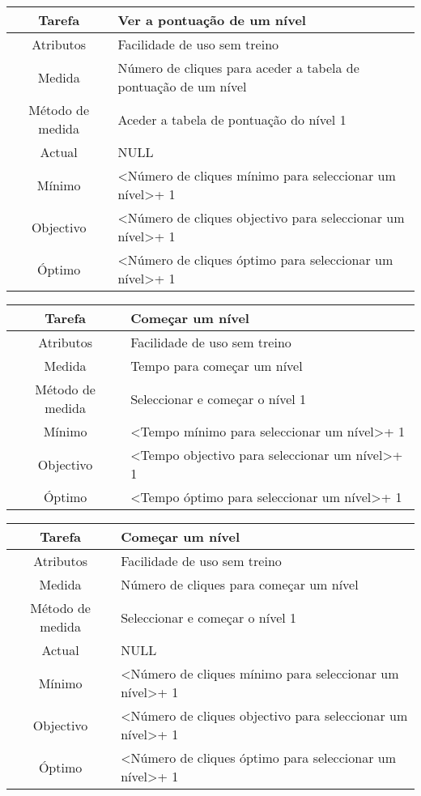\begin{center}
	\begin{tabular} {|c|p{10cm}|}
		\hline
		Tarefa & Ver a pontuação de um nível \\
		\hline
		Atributos & Facilidade de uso sem treino \\
		\hline
		Medida & Número de cliques para aceder a tabela de pontuação de um nível \\
		\hline
		Método de medida & Aceder a tabela de pontuação do nível 1 \\
		\hline
		Actual & NULL \\
		Mínimo & \textless Número de cliques mínimo para seleccionar um nível\textgreater + 1 \\
		Objectivo & \textless Número de cliques objectivo para seleccionar um nível\textgreater + 1 \\
		Óptimo & \textless Número de cliques óptimo para seleccionar um nível\textgreater + 1 \\
		\hline
	\end{tabular}
\end{center}

\begin{center}
	\begin{tabular} {|c|p{10cm}|}
		\hline
		Tarefa & Começar um nível \\
		\hline
		Atributos & Facilidade de uso sem treino \\
		\hline
		Medida & Tempo para começar um nível \\
		\hline
		Método de medida & Seleccionar e começar o nível 1 \\
		\hline
		Mínimo & \textless Tempo mínimo para seleccionar um nível\textgreater + 1 \\
		Objectivo & \textless Tempo objectivo para seleccionar um nível\textgreater + 1 \\
		Óptimo & \textless Tempo óptimo para seleccionar um nível\textgreater + 1 \\
		\hline
	\end{tabular}
\end{center}

\begin{center}
	\begin{tabular} {|c|p{10cm}|}
		\hline
		Tarefa & Começar um nível \\
		\hline
		Atributos & Facilidade de uso sem treino \\
		\hline
		Medida & Número de cliques para começar um nível \\
		\hline
		Método de medida & Seleccionar e começar o nível 1 \\
		\hline
		Actual & NULL \\
		\hline
		Mínimo & \textless Número de cliques mínimo para seleccionar um nível\textgreater + 1 \\
		Objectivo & \textless Número de cliques objectivo para seleccionar um nível\textgreater + 1 \\
		Óptimo & \textless Número de cliques óptimo para seleccionar um nível\textgreater + 1 \\
		\hline
	\end{tabular}
\end{center}

